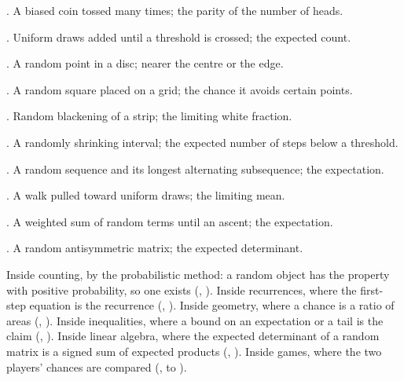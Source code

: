 \begin{ladder}
\item {}. A biased coin tossed many times; the parity of the number of heads.
\item {}. Uniform draws added until a threshold is crossed; the expected count.
\item {}. A random point in a disc; nearer the centre or the edge.
\item {}. A random square placed on a grid; the chance it avoids certain points.
\item {}. Random blackening of a strip; the limiting white fraction.
\item {}. A randomly shrinking interval; the expected number of steps below a threshold.
\item {}. A random sequence and its longest alternating subsequence; the expectation.
\item {}. A walk pulled toward uniform draws; the limiting mean.
\item {}. A weighted sum of random terms until an ascent; the expectation.
\item {}. A random antisymmetric matrix; the expected determinant.
\end{ladder}

\begin{hides}
Inside counting, by the probabilistic method: a random object has the property with positive probability, so one exists (, ). Inside recurrences, where the first-step equation is the recurrence (, ). Inside geometry, where a chance is a ratio of areas (, ). Inside inequalities, where a bound on an expectation or a tail is the claim (, ). Inside linear algebra, where the expected determinant of a random matrix is a signed sum of expected products (, ). Inside games, where the two players' chances are compared (,  to ).
\end{hides}
